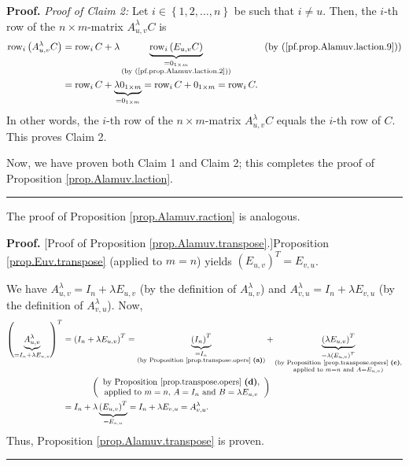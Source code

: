 \documentclass[numbers=enddot,12pt,final,onecolumn,notitlepage]{scrartcl}%
\theoremstyle{definition}
\newenvironment{proof}[1][Proof]{\noindent\textbf{#1.} }{\ \rule{0.5em}{0.5em}}
\begin{document}
\begin{proof}
\textit{Proof of Claim 2:} Let $i\in\left\{  1,2,\ldots,n\right\}  $ be such
that $i\neq u$. Then, the $i$-th row of the $n\times m$-matrix $A_{u,v}%
^{\lambda}C$ is%
\begin{align*}
\operatorname*{row}\nolimits_{i}\left(  A_{u,v}^{\lambda}C\right)   &
=\operatorname*{row}\nolimits_{i}C+\lambda\underbrace{\operatorname*{row}%
\nolimits_{i}\left(  E_{u,v}C\right)  }_{\substack{=0_{1\times m}\\\text{(by
(\ref{pf.prop.Alamuv.laction.2}))}}}\ \ \ \ \ \ \ \ \ \ \left(  \text{by
(\ref{pf.prop.Alamuv.laction.9})}\right) \\
&  =\operatorname*{row}\nolimits_{i}C+\underbrace{\lambda0_{1\times m}%
}_{=0_{1\times m}}=\operatorname*{row}\nolimits_{i}C+0_{1\times m}%
=\operatorname*{row}\nolimits_{i}C.
\end{align*}
In other words, the $i$-th row of the $n\times m$-matrix $A_{u,v}^{\lambda}C$
equals the $i$-th row of $C$. This proves Claim 2.

Now, we have proven both Claim 1 and Claim 2; this completes the proof of
Proposition \ref{prop.Alamuv.laction}.
\end{proof}

The proof of Proposition \ref{prop.Alamuv.raction} is analogous.

\begin{proof}
[Proof of Proposition \ref{prop.Alamuv.transpose}.]Proposition
\ref{prop.Euv.transpose} (applied to $m=n$) yields $\left(  E_{u,v}\right)
^{T}=E_{v,u}$.

We have $A_{u,v}^{\lambda}=I_{n}+\lambda E_{u,v}$ (by the definition of
$A_{u,v}^{\lambda}$) and $A_{v,u}^{\lambda}=I_{n}+\lambda E_{v,u}$ (by the
definition of $A_{v,u}^{\lambda}$). Now,
\begin{align*}
\left(  \underbrace{A_{u,v}^{\lambda}}_{=I_{n}+\lambda E_{u,v}}\right)  ^{T}
&  =\left(  I_{n}+\lambda E_{u,v}\right)  ^{T}=\underbrace{\left(
I_{n}\right)  ^{T}}_{\substack{=I_{n}\\\text{(by Proposition
\ref{prop.transpose.opers} \textbf{(a)})}}}+\underbrace{\left(  \lambda
E_{u,v}\right)  ^{T}}_{\substack{=\lambda\left(  E_{u,v}\right)
^{T}\\\text{(by Proposition \ref{prop.transpose.opers} \textbf{(c)}%
,}\\\text{applied to }m=n\text{ and }A=E_{u,v}\text{)}}}\\
&  \ \ \ \ \ \ \ \ \ \ \left(
\begin{array}
[c]{c}%
\text{by Proposition \ref{prop.transpose.opers} \textbf{(d)},}\\
\text{applied to }m=n\text{, }A=I_{n}\text{ and }B=\lambda E_{u,v}%
\end{array}
\right) \\
&  =I_{n}+\lambda\underbrace{\left(  E_{u,v}\right)  ^{T}}_{=E_{v,u}}%
=I_{n}+\lambda E_{v,u}=A_{v,u}^{\lambda}.
\end{align*}
Thus, Proposition \ref{prop.Alamuv.transpose} is proven.
\end{proof}
\end{document}
